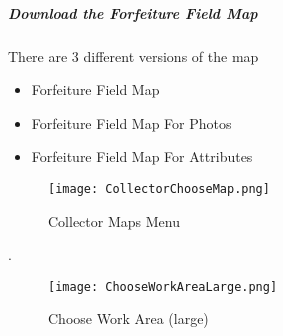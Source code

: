 
 \clearpage
 \subparagraph[Download the Forfeiture Field Map]{Download the Forfeiture Field Map \texorpdfstring{\\}{}}
 \noindent There are 3 different versions of the map
 \vspace{.05in}

 \begin{itemize}
 \item Forfeiture Field Map
 \item Forfeiture Field Map For Photos
 \item Forfeiture Field Map For Attributes
 \end{itemize}

 \begin{wrapfigure}{r}{0.5\textwidth}
 \centering
     \texttt{[image: CollectorChooseMap.png]}
 \caption{Collector Maps Menu}
 \end{wrapfigure}
.
 \vspace{.5in}

 \vspace{1.75in}


 \clearpage
 \begin{wrapfigure}{r}{0.5\textwidth}
 \centering
     \texttt{[image: ChooseWorkAreaLarge.png]}
 \caption{Choose Work Area (large)}
 \end{wrapfigure}

 \vspace{1.5in}

 {\btn{} \lookArrow}
 \vspace{.2in}

 \clearpage
